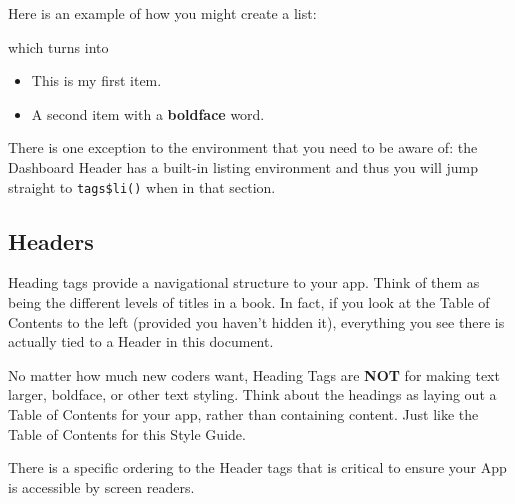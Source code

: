 \documentclass[
]{book}
\newenvironment{Shaded}{\begin{snugshade}}{\end{snugshade}}
\newcommand{\KeywordTok}[1]{\textcolor[rgb]{0.13,0.29,0.53}{\textbf{#1}}}
\newcommand{\NormalTok}[1]{#1}
\newcommand{\OperatorTok}[1]{\textcolor[rgb]{0.81,0.36,0.00}{\textbf{#1}}}
\newcommand{\StringTok}[1]{\textcolor[rgb]{0.31,0.60,0.02}{#1}}
\providecommand{\tightlist}{%
  \setlength{\itemsep}{0pt}\setlength{\parskip}{0pt}}
\begin{document}
Here is an example of how you might create a list:

\begin{Shaded}
\end{Shaded}

which turns into

\begin{itemize}
\tightlist
\item
  This is my first item.
\item
  A second item with a \textbf{boldface} word.
\end{itemize}

There is one exception to the environment that you need to be aware of: the Dashboard Header has a built-in listing environment and thus you will jump straight to \texttt{tags\$li()} when in that section.

\hypertarget{headersc}{%
\subsection{Headers}\label{headersc}}

Heading tags provide a navigational structure to your app. Think of them as being the different levels of titles in a book. In fact, if you look at the Table of Contents to the left (provided you haven't hidden it), everything you see there is actually tied to a Header in this document.

No matter how much new coders want, Heading Tags are \textbf{NOT} for making text larger, boldface, or other text styling. Think about the headings as laying out a Table of Contents for your app, rather than containing content. Just like the Table of Contents for this Style Guide.

There is a specific ordering to the Header tags that is critical to ensure your App is accessible by screen readers.
\end{document}

